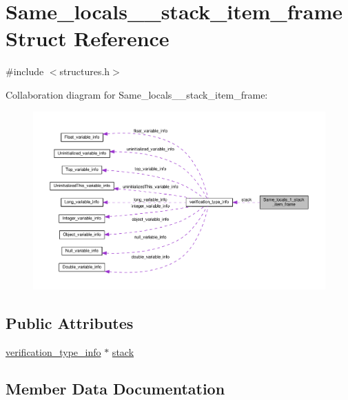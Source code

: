 \hypertarget{structSame__locals__1__stack__item__frame}{}\section{Same\+\_\+locals\+\_\+\_\+stack\+\_\+item\+\_\+frame Struct Reference}
\label{structSame__locals__1__stack__item__frame}


{\ttfamily \#include $<$structures.\+h$>$}



Collaboration diagram for Same\+\_\+locals\+\_\+\_\+stack\+\_\+item\+\_\+frame\+:
\nopagebreak
\begin{figure}[H]
\begin{center}
\leavevmode
\includegraphics[width=350pt]{structSame__locals__1__stack__item__frame__coll__graph}
\end{center}
\end{figure}
\subsection*{Public Attributes}
\begin{DoxyCompactItemize}
\item 
\hyperlink{structverification__type__info}{verification\+\_\+type\+\_\+info} $\ast$ \hyperlink{structSame__locals__1__stack__item__frame_aea334c9e9f4e42aad07a6ec10a7f058a}{stack}
\end{DoxyCompactItemize}


\subsection{Member Data Documentation}
